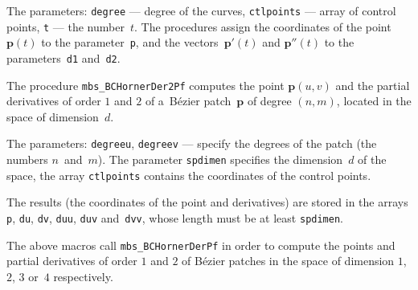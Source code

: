 The parameters: \texttt{degree} --- degree of the curves, \texttt{ctlpoints} ---
array of control points, \texttt{t} --- the number~$t$.
The procedures assign the coordinates of the point $\bm{p}(t)$
to the parameter~\texttt{p}, and the vectors~$\bm{p}'(t)$ and $\bm{p}''(t)$
to the parameters~\texttt{d1} and~\texttt{d2}.

\vspace{\bigskipamount}
The procedure \texttt{mbs\_BCHornerDer2Pf} computes the point $\bm{p}(u,v)$
and the partial derivatives of order $1$ and $2$ of a~B\'{e}zier patch~$\bm{p}$
of degree $(n,m)$, located in the space of dimension~$d$.

The parameters: \texttt{degreeu}, \texttt{degreev} --- specify the degrees
of the patch (the numbers $n$~and~$m$). The parameter \texttt{spdimen}
specifies the dimension~$d$ of the space, the array \texttt{ctlpoints}
contains the coordinates of the control points.

The results (the coordinates of the point and derivatives) are
stored in the arrays \texttt{p}, \texttt{du}, \texttt{dv}, \texttt{duu},
\texttt{duv} and~\texttt{dvv}, whose length
must be at least \texttt{spdimen}.

\vspace{\bigskipamount}
The above macros call \texttt{mbs\_BCHornerDerPf} in order to compute
the points and partial derivatives of order $1$ and $2$ of B\'{e}zier
patches in the space of dimension $1$, $2$, $3$ or~$4$ respectively.


